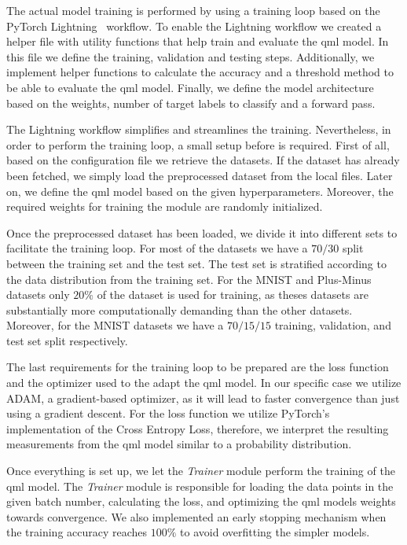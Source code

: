 The actual model training is performed by using a training loop
based on the PyTorch Lightning~\cite{falcon_pytorch_2019} workflow.
To enable the Lightning workflow we created a helper file with
utility functions that help train and evaluate the \ac{qml} model.
In this file we define the training, validation and testing steps.
Additionally, we implement helper functions to calculate the 
accuracy and a threshold method to be able to evaluate the \ac{qml}
model. Finally, we define the model architecture based on the
weights, number of target labels to classify and a forward pass. \

The Lightning workflow simplifies and streamlines the training.
Nevertheless, in order to perform the training loop, a small
setup before is required. First of all, based on the configuration
file we retrieve the datasets. If the dataset has already been
fetched, we simply load the preprocessed dataset from the local files.
Later on, we define the \ac{qml} model based on the given hyperparameters.
Moreover, the required weights for training the module are randomly
initialized. \


Once the preprocessed dataset has been loaded, we divide it into
different sets to facilitate the training loop. For most of
the datasets we have a \(70/30\) split between the training
set and the test set. The test set is stratified according
to the data distribution from the training set. For the
MNIST and Plus-Minus datasets only \(20\%\) of the dataset
is used for training, as theses datasets are substantially
more computationally demanding than the other datasets. Moreover,
for the MNIST datasets we have a \(70/15/15\) training, 
validation, and test set split respectively. \

The last requirements for the training loop to be prepared are the
loss function and the optimizer used to the adapt the \ac{qml} model. In our
specific case we utilize ADAM, a gradient-based optimizer, as it will
lead to faster convergence than just using a gradient descent. For the
loss function we utilize PyTorch's implementation of the Cross Entropy
Loss, therefore, we interpret the resulting measurements from the
\ac{qml} model similar to a probability distribution.  \

Once everything is set up, we let the \textit{Trainer} module
perform the training of the \ac{qml} model. The \textit{Trainer}
module is responsible for loading the data points in the given
batch number, calculating the loss, and optimizing the \ac{qml}
models weights towards convergence. We also implemented an early
stopping mechanism when the training accuracy reaches \(100\%\)
to avoid overfitting the simpler models. \

